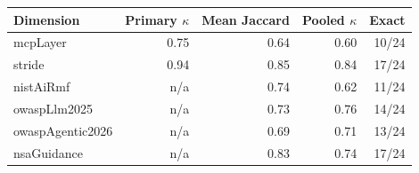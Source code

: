 \begin{tabular}{@{}lrrrr@{}}
\toprule
Dimension & Primary $\kappa$ & Mean Jaccard & Pooled $\kappa$ & Exact \\
\midrule
mcpLayer & 0.75 & 0.64 & 0.60 & 10/24 \\
stride & 0.94 & 0.85 & 0.84 & 17/24 \\
nistAiRmf & n/a & 0.74 & 0.62 & 11/24 \\
owaspLlm2025 & n/a & 0.73 & 0.76 & 14/24 \\
owaspAgentic2026 & n/a & 0.69 & 0.71 & 13/24 \\
nsaGuidance & n/a & 0.83 & 0.74 & 17/24 \\
\bottomrule
\end{tabular}
